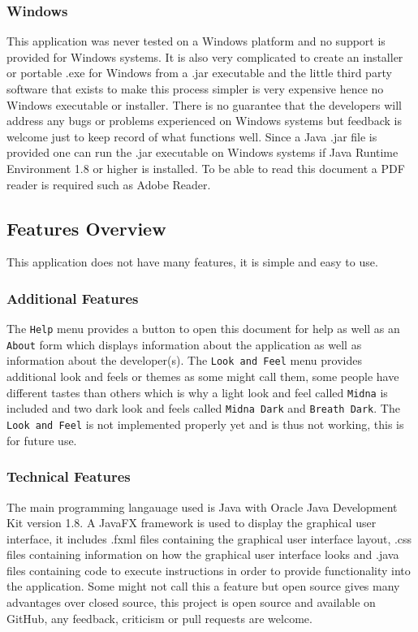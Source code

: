 \documentclass[11pt]{article}
\newcommand{\code}[1]{\texttt{#1}}
\begin{document}
			\subsubsection{Windows}
				This application was never tested on a Windows platform and no support is provided for Windows systems. It is also very complicated to create an installer or portable .exe for Windows from a .jar executable and the little third party software that exists to make this process simpler is very expensive hence no Windows executable or installer. There is no guarantee that the developers will address any bugs or problems experienced on Windows systems but feedback is welcome just to keep record of what functions well. Since a Java .jar file is provided one can run the .jar executable on Windows systems if Java Runtime Environment 1.8 or higher is installed. To be able to read this document a PDF reader is required such as Adobe Reader.

		\subsection{Features Overview}
			This application does not have many features, it is simple and easy to use. 

			\subsubsection{Additional Features}
				The \code{Help} menu provides a button to open this document for help as well as an \code{About} form which displays information about the application as well as information about the developer(s). The \code{Look and Feel} menu provides additional look and feels or themes as some might call them, some people have different tastes than others which is why a light look and feel called \code{Midna} is included and two dark look and feels called \code{Midna Dark} and \code{Breath Dark}. The \code{Look and Feel} is not implemented properly yet and is thus not working, this is for future use.

			\subsubsection{Technical Features}
				The main programming langauage used is Java with Oracle Java Development Kit version 1.8. A JavaFX framework is used to display the graphical user interface, it includes .fxml files containing the graphical user interface layout, .css files containing information on how the graphical user interface looks and .java files containing code to execute instructions in order to provide functionality into the application. Some might not call this a feature but open source gives many advantages over closed source, this project is open source and available on GitHub, any feedback, criticism or pull requests are welcome.
\end{document}
